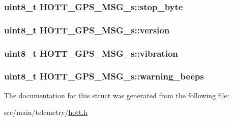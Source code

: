 \hypertarget{structHOTT__GPS__MSG__s_ab16a226b57f7ec4143cfd4b76dda7c90}{
\subsubsection[{stop\+\_\+byte}]{\setlength{\rightskip}{0pt plus 5cm}uint8\+\_\+t H\+O\+T\+T\+\_\+\+G\+P\+S\+\_\+\+M\+S\+G\+\_\+s\+::stop\+\_\+byte}}\label{structHOTT__GPS__MSG__s_ab16a226b57f7ec4143cfd4b76dda7c90}
\hypertarget{structHOTT__GPS__MSG__s_a0dd93108c32dafa5eb0b01f10be0730f}{
\subsubsection[{version}]{\setlength{\rightskip}{0pt plus 5cm}uint8\+\_\+t H\+O\+T\+T\+\_\+\+G\+P\+S\+\_\+\+M\+S\+G\+\_\+s\+::version}}\label{structHOTT__GPS__MSG__s_a0dd93108c32dafa5eb0b01f10be0730f}
\hypertarget{structHOTT__GPS__MSG__s_aa78f346e11e432c608b43b034a7adb68}{
\subsubsection[{vibration}]{\setlength{\rightskip}{0pt plus 5cm}uint8\+\_\+t H\+O\+T\+T\+\_\+\+G\+P\+S\+\_\+\+M\+S\+G\+\_\+s\+::vibration}}\label{structHOTT__GPS__MSG__s_aa78f346e11e432c608b43b034a7adb68}
\hypertarget{structHOTT__GPS__MSG__s_a31a2608ff8cd95111adbf41c177c068c}{
\subsubsection[{warning\+\_\+beeps}]{\setlength{\rightskip}{0pt plus 5cm}uint8\+\_\+t H\+O\+T\+T\+\_\+\+G\+P\+S\+\_\+\+M\+S\+G\+\_\+s\+::warning\+\_\+beeps}}\label{structHOTT__GPS__MSG__s_a31a2608ff8cd95111adbf41c177c068c}


The documentation for this struct was generated from the following file\+:\begin{DoxyCompactItemize}
\item 
src/main/telemetry/\hyperlink{telemetry_2hott_8h}{hott.\+h}\end{DoxyCompactItemize}
